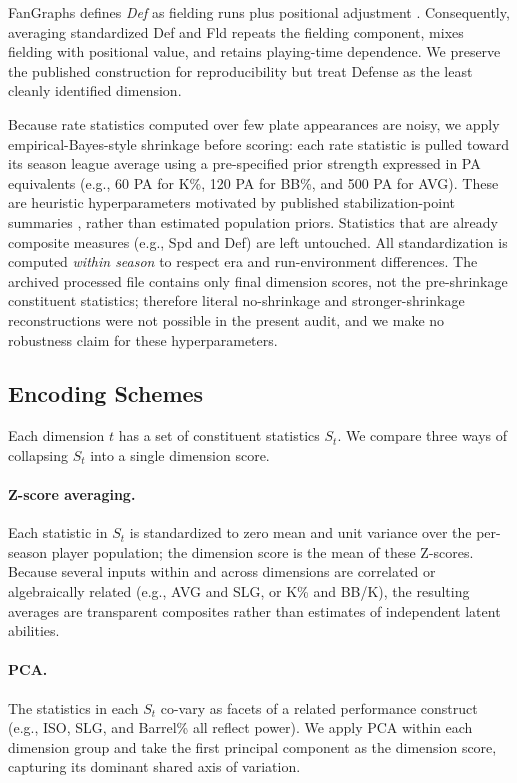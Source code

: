 \documentclass[10pt,twocolumn,letterpaper]{article}
\begin{document}
FanGraphs defines \emph{Def} as fielding runs plus positional adjustment \cite{fangraphsDef}. Consequently, averaging standardized Def and Fld repeats the fielding component, mixes fielding with positional value, and retains playing-time dependence. We preserve the published construction for reproducibility but treat Defense as the least cleanly identified dimension.

Because rate statistics computed over few plate appearances are noisy, we apply empirical-Bayes-style shrinkage before scoring: each rate statistic is pulled toward its season league average using a pre-specified prior strength expressed in PA equivalents (e.g., 60 PA for K\%, 120 PA for BB\%, and 500 PA for AVG). These are heuristic hyperparameters motivated by published stabilization-point summaries \cite{fangraphsSampleSize}, rather than estimated population priors. Statistics that are already composite measures (e.g., Spd and Def) are left untouched. All standardization is computed \emph{within season} to respect era and run-environment differences. The archived processed file contains only final dimension scores, not the pre-shrinkage constituent statistics; therefore literal no-shrinkage and stronger-shrinkage reconstructions were not possible in the present audit, and we make no robustness claim for these hyperparameters.

\subsection{Encoding Schemes}
Each dimension $t$ has a set of constituent statistics $S_t$. We compare three ways of collapsing $S_t$ into a single dimension score.

\paragraph{Z-score averaging.}
Each statistic in $S_t$ is standardized to zero mean and unit variance over the per-season player population; the dimension score is the mean of these Z-scores. Because several inputs within and across dimensions are correlated or algebraically related (e.g., AVG and SLG, or K\% and BB/K), the resulting averages are transparent composites rather than estimates of independent latent abilities.

\paragraph{PCA.}
The statistics in each $S_t$ co-vary as facets of a related performance construct (e.g., ISO, SLG, and Barrel\% all reflect power). We apply PCA within each dimension group and take the first principal component as the dimension score, capturing its dominant shared axis of variation.
\end{document}

